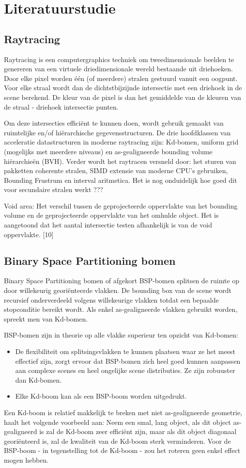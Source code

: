 \chapter{Literatuurstudie}
\label{hoofdstuk:literature}

\section{Raytracing}
Raytracing is een computergraphics techniek om tweedimensionale beelden te genereren van een virtuele driedimensionale wereld bestaande uit driehoeken.
Door elke pixel worden één (of meerdere) stralen gestuurd vanuit een oogpunt.
Voor elke straal wordt dan de dichtstbijzijnde intersectie met een driehoek in de scene berekend.
De kleur van de pixel is dan het gemiddelde van de kleuren van de straal - driehoek intersectie punten.

Om deze intersecties efficiënt te kunnen doen, wordt gebruik gemaakt van ruimtelijke en/of hiërarchische gegevensstructuren.
De drie hoofdklassen van acceleratie datastructuren in moderne raytracing zijn: Kd-bomen, uniform grid (mogelijks met meerdere niveaus) en as-gealigneerde bounding volume hiërarchieën (BVH). 
Verder wordt het raytracen versneld door: het sturen van pakketten coherente stralen, SIMD extensie van moderne CPU's gebruiken, Bounding Frustrum en interval aritmetica.
Het is nog onduidelijk hoe goed dit voor secundaire stralen werkt ???

Void area: Het verschil tussen de geprojecteerde oppervlakte van het bounding volume en de geprojecteerde oppervlakte van het omhulde object.
Het is aangetoond dat het aantal intersectie testen afhankelijk is van de void oppervlakte. [10]

\section{Binary Space Partitioning bomen}
Binary Space Partitioning bomen of afgekort BSP-bomen splitsen de ruimte op door willekeurig georiënteerde vlakken.
De bounding box van de scene wordt recursief onderverdeeld volgens willekeurige vlakken totdat een bepaalde stopconditie bereikt wordt.
Als enkel as-gealigneerde vlakken gebruikt worden, spreekt men van Kd-bomen.


BSP-bomen zijn in theorie op alle vlakke superieur ten opzicht van Kd-bomen:
\begin{itemize}
	\item De flexibiliteit om splitsingsvlakken te kunnen plaatsen waar ze het meest effectief zijn, zorgt ervoor dat BSP-bomen zich heel goed kunnen aanpassen aan complexe scenes en heel ongelijke scene distributies. Ze zijn robuuster dan Kd-bomen.
	\item Elke Kd-boom kan als een BSP-boom worden uitgedrukt.
\end{itemize}
Een Kd-boom is relatief makkelijk te breken met niet as-gealigneerde geometrie, \cite{Ize} haalt het volgende voorbeeld aan: Neem een smal, lang object, als dit object as-gealigneerd is zal de Kd-boom zeer efficiënt zijn, maar als dit object diagonaal georiënteerd is, zal de kwaliteit van de Kd-boom sterk verminderen.
Voor de BSP-boom - in tegenstelling tot de Kd-boom - zou het roteren geen enkel effect mogen hebben.


